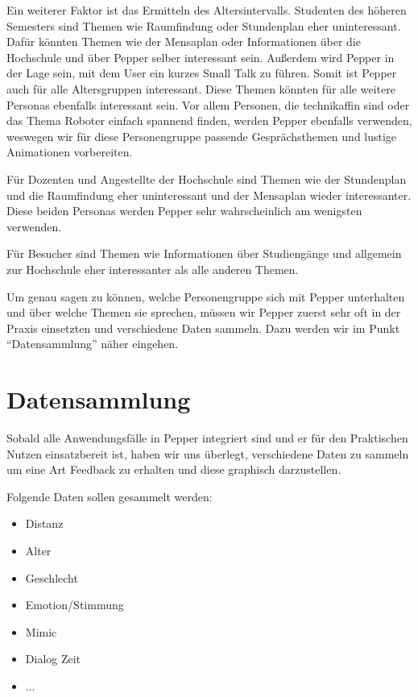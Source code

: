 Ein weiterer Faktor ist das Ermitteln des Altersintervalls. Studenten des höheren Semesters sind Themen wie Raumfindung oder Stundenplan eher uninteressant. Dafür könnten Themen wie der Mensaplan oder Informationen über die Hochschule und über Pepper selber interessant sein. Außerdem wird Pepper in der Lage sein, mit dem User ein kurzes Small Talk zu führen. Somit ist Pepper auch für alle Altersgruppen interessant. Diese Themen könnten für alle weitere Personas ebenfalls interessant sein. Vor allem Personen, die technikaffin sind oder das Thema Roboter einfach spannend finden, werden Pepper ebenfalls verwenden, weswegen wir für diese Personengruppe passende Gesprächsthemen und lustige Animationen vorbereiten.

Für Dozenten und Angestellte der Hochschule sind Themen wie der Stundenplan und die Raumfindung eher uninteressant und der Mensaplan wieder interessanter. Diese beiden Personas werden Pepper sehr wahrscheinlich am wenigsten verwenden.

Für Besucher sind Themen wie Informationen über Studiengänge und allgemein zur Hochschule eher interessanter als alle anderen Themen.

Um genau sagen zu können, welche Personengruppe sich mit Pepper unterhalten und über welche Themen sie sprechen, müssen wir Pepper zuerst sehr oft in der Praxis einsetzten und verschiedene Daten sammeln. Dazu werden wir im Punkt “Datensammlung” näher eingehen.\\ 


\section{Datensammlung}
Sobald alle Anwendungsfälle in Pepper integriert sind und er für den Praktischen Nutzen einsatzbereit ist, haben wir uns überlegt, verschiedene Daten zu sammeln um eine Art Feedback zu erhalten und diese graphisch darzustellen.

Folgende Daten sollen gesammelt werden:
\begin{itemize}
    \item Distanz
    \item Alter
    \item Geschlecht
    \item Emotion/Stimmung
    \item Mimic
    \item Dialog Zeit
    \item ...
\end{itemize}


